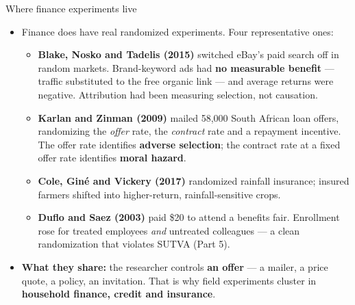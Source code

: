 \documentclass[
  11pt,
  ignorenonframetext,
  aspectratio=169,
]{beamer}
\providecommand{\tightlist}{%
  \setlength{\itemsep}{0pt}\setlength{\parskip}{0pt}}
\begin{document}
\begin{frame}{Where finance experiments live}
\protect{}\label{where-finance-experiments-live}
\begin{itemize}
\tightlist
\item
  Finance does have real randomized experiments. Four representative
  ones:

  \begin{itemize}
  \tightlist
  \item
    \textbf{Blake, Nosko and Tadelis (2015)} switched eBay's paid search
    off in random markets. Brand-keyword ads had \textbf{no measurable
    benefit} --- traffic substituted to the free organic link --- and
    average returns were negative. Attribution had been measuring
    selection, not causation.
  \item
    \textbf{Karlan and Zinman (2009)} mailed 58,000 South African loan
    offers, randomizing the \emph{offer} rate, the \emph{contract} rate
    and a repayment incentive. The offer rate identifies \textbf{adverse
    selection}; the contract rate at a fixed offer rate identifies
    \textbf{moral hazard}.
  \item
    \textbf{Cole, Giné and Vickery (2017)} randomized rainfall
    insurance; insured farmers shifted into higher-return,
    rainfall-sensitive crops.
  \item
    \textbf{Duflo and Saez (2003)} paid \$20 to attend a benefits fair.
    Enrollment rose for treated employees \emph{and} untreated
    colleagues --- a clean randomization that violates SUTVA (Part 5).
  \end{itemize}
\item
  \textbf{What they share:} the researcher controls \textbf{an offer}
  --- a mailer, a price quote, a policy, an invitation. That is why
  field experiments cluster in \textbf{household finance, credit and
  insurance}.
\end{itemize}
\end{frame}
\end{document}
